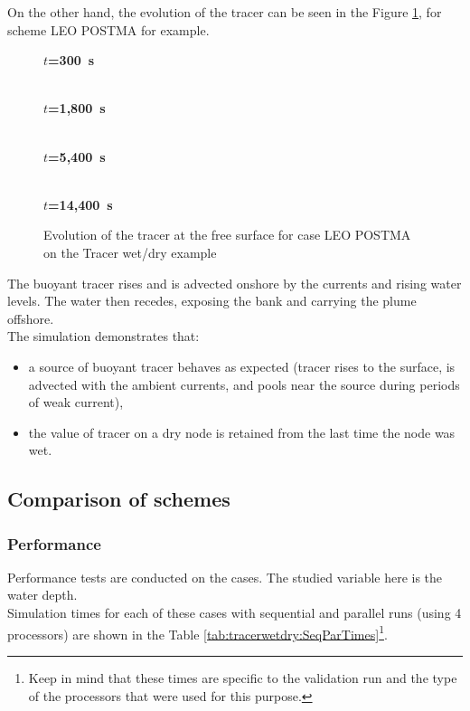 On the other hand, the evolution of the tracer can be seen in the Figure \ref{fig:tracerwetdry:Tracer_LEO}, for scheme LEO POSTMA for example.

\begin{figure}[H]
  \centering
  \textbf{$t$=300~s}\par\medskip
  \\
  \textbf{$t$=1,800~s}\par\medskip
  \\
  \textbf{$t$=5,400~s}\par\medskip
  \\
  \textbf{$t$=14,400~s}\par\medskip
  \caption{Evolution of the tracer at the free surface for case LEO POSTMA on the Tracer wet/dry example}\label{fig:tracerwetdry:Tracer_LEO}
\end{figure}

The buoyant tracer rises and is advected onshore by the currents and rising water levels.
The water then recedes, exposing the bank and carrying the plume offshore. \\

The simulation demonstrates that:
\begin{itemize}
\item a source of buoyant tracer behaves as expected (tracer rises to the surface,
  is advected with the ambient currents, and pools near the source during periods of weak current),
\item the value of tracer on a dry node is retained from the last time the node was wet.
\end{itemize}

\subsection{Comparison of schemes}
\subsubsection*{Performance}
Performance tests are conducted on the cases. The studied variable here is the water depth.\\

Simulation times for each  of these cases with sequential and parallel runs
(using 4 processors) are shown in the Table \ref{tab:tracerwetdry:SeqParTimes}\footnote{Keep
in mind that these times are specific to the validation run and the type of the processors that were used for this purpose.}.

